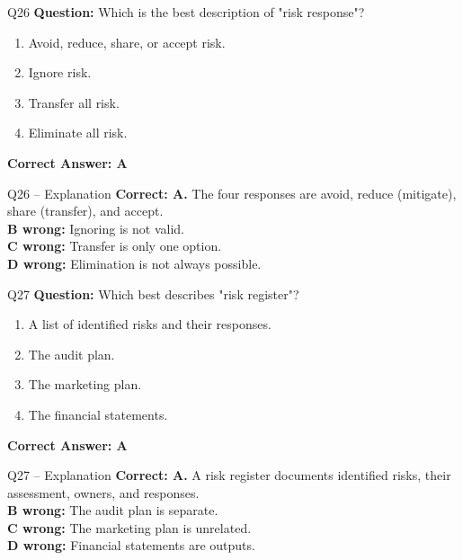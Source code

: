 \documentclass[aspectratio=169,10pt]{beamer}
\begin{document}
	\begin{frame}[t]{Q26}
		\small
		\textbf{Question:} Which is the best description of "risk response"?
		\begin{enumerate}[label=\Alph*.,itemsep=1pt,topsep=2pt]
			\item Avoid, reduce, share, or accept risk.
			\item Ignore risk.
			\item Transfer all risk.
			\item Eliminate all risk.
		\end{enumerate}
		\vspace{4pt}
		\textbf{Correct Answer: A}
	\end{frame}
	
	\begin{frame}[t]{Q26 -- Explanation}
		\small
		\textbf{Correct: A.} The four responses are avoid, reduce (mitigate), share (transfer), and accept. \\[4pt]
		\textbf{B wrong:} Ignoring is not valid. \\[2pt]
		\textbf{C wrong:} Transfer is only one option. \\[2pt]
		\textbf{D wrong:} Elimination is not always possible.
	\end{frame}
	
	\begin{frame}[t]{Q27}
		\small
		\textbf{Question:} Which best describes "risk register"?
		\begin{enumerate}[label=\Alph*.,itemsep=1pt,topsep=2pt]
			\item A list of identified risks and their responses.
			\item The audit plan.
			\item The marketing plan.
			\item The financial statements.
		\end{enumerate}
		\vspace{4pt}
		\textbf{Correct Answer: A}
	\end{frame}
	
	\begin{frame}[t]{Q27 -- Explanation}
		\small
		\textbf{Correct: A.} A risk register documents identified risks, their assessment, owners, and responses. \\[4pt]
		\textbf{B wrong:} The audit plan is separate. \\[2pt]
		\textbf{C wrong:} The marketing plan is unrelated. \\[2pt]
		\textbf{D wrong:} Financial statements are outputs.
	\end{frame}
	
\end{document}
